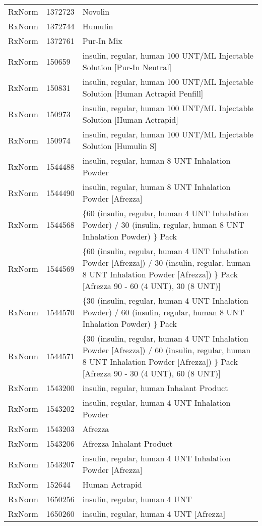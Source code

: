 \begin{longtable}{p{}p{}p{}}
  RxNorm & 1372723 & Novolin \\ 
  RxNorm & 1372744 & Humulin \\ 
  RxNorm & 1372761 & Pur-In Mix \\ 
  RxNorm & 150659 & insulin, regular, human 100 UNT/ML Injectable Solution [Pur-In Neutral] \\ 
  RxNorm & 150831 & insulin, regular, human 100 UNT/ML Injectable Solution [Human Actrapid Penfill] \\ 
  RxNorm & 150973 & insulin, regular, human 100 UNT/ML Injectable Solution [Human Actrapid] \\ 
  RxNorm & 150974 & insulin, regular, human 100 UNT/ML Injectable Solution [Humulin S] \\ 
  RxNorm & 1544488 & insulin, regular, human 8 UNT Inhalation Powder \\ 
  RxNorm & 1544490 & insulin, regular, human 8 UNT Inhalation Powder [Afrezza] \\ 
  RxNorm & 1544568 & \{60 (insulin, regular, human 4 UNT Inhalation Powder) / 30 (insulin, regular, human 8 UNT Inhalation Powder) \} Pack \\ 
  RxNorm & 1544569 & \{60 (insulin, regular, human 4 UNT Inhalation Powder [Afrezza]) / 30 (insulin, regular, human 8 UNT Inhalation Powder [Afrezza]) \} Pack [Afrezza 90 - 60 (4 UNT), 30 (8 UNT)] \\ 
  RxNorm & 1544570 & \{30 (insulin, regular, human 4 UNT Inhalation Powder) / 60 (insulin, regular, human 8 UNT Inhalation Powder) \} Pack \\ 
  RxNorm & 1544571 & \{30 (insulin, regular, human 4 UNT Inhalation Powder [Afrezza]) / 60 (insulin, regular, human 8 UNT Inhalation Powder [Afrezza]) \} Pack [Afrezza 90 - 30 (4 UNT), 60 (8 UNT)] \\ 
  RxNorm & 1543200 & insulin, regular, human Inhalant Product \\ 
  RxNorm & 1543202 & insulin, regular, human 4 UNT Inhalation Powder \\ 
  RxNorm & 1543203 & Afrezza \\ 
  RxNorm & 1543206 & Afrezza Inhalant Product \\ 
  RxNorm & 1543207 & insulin, regular, human 4 UNT Inhalation Powder [Afrezza] \\ 
  RxNorm & 152644 & Human Actrapid \\ 
  RxNorm & 1650256 & insulin, regular, human 4 UNT \\ 
  RxNorm & 1650260 & insulin, regular, human 4 UNT [Afrezza] \\ 

\end{longtable}
